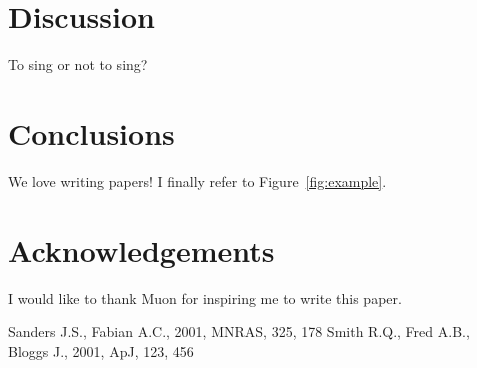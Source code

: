 \documentclass[usegraphicx]{mn2e}
\begin{document}
\section{Discussion}
To sing or not to sing?

\section{Conclusions}
We love writing papers! I finally refer to Figure~\ref{fig:example}.

\section*{Acknowledgements}
I would like to thank Muon for inspiring me to write this paper.

\begin{thebibliography}{}
 Sanders J.S., Fabian A.C., 2001, MNRAS, 325, 178
 Smith R.Q., Fred A.B., Bloggs J., 2001, ApJ, 123, 456
\end{thebibliography}
\end{document}
